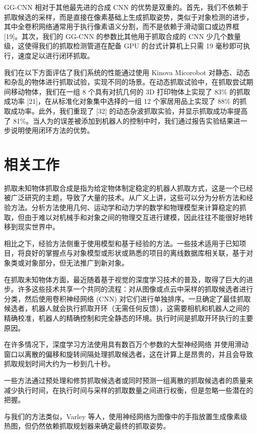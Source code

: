 GG-CNN 相对于其他最先进的合成 CNN 的优势是双重的。首先，我们不依赖于抓取候选的采样，而是直接在像素基础上生成抓取姿势，类似于对象检测的进步，其中全卷积网络通常用于执行像素语义分割，而不是依赖于滑动窗口或边界框 [19]。其次，我们的 GG-CNN 的参数比其他用于抓取合成的 CNN 少几个数量级，这使得我们的抓取检测管道在配备 GPU 的台式计算机上只需 19 毫秒即可执行，速度足以进行闭环抓取。


我们在以下方面评估了我们系统的性能通过使用 Kinova Micorobot 对静态、动态和杂乱的物体进行抓取试验，实现不同的场景。在动态抓取试验中，在抓取尝试期间移动物体，我们在一组 8 个具有对抗几何的 3D 打印物体上实现了 83\% 的抓取成功率 [21]，在从标准化对象集中选择的一组 12 个家居用品上实现了 88\% 的抓取成功率。此外，我们重现了 [32] 的动态杂波抓取实验，并显示抓取成功率提高了 81\%。当人为的误差被添加到机器人的控制中时，我们通过报告实验结果进一步说明使用闭环方法的优势。
\section{相关工作}
抓取未知物体抓取合成是指为给定物体制定稳定的机器人抓取方式，这是一个已经被广泛研究的主题，导致了大量的技术。从广义上讲，这些可以分为分析方法和经验方法。分析方法使用几何、运动学和动力学的数学和物理模型来计算稳定的抓取，但由于难以对机械手和对象之间的物理交互进行建模，因此往往不能很好地转移到现实世界中。


相比之下，经验方法侧重于使用模型和基于经验的方法。一些技术适用于已知项目，将良好的掌握点与对象模型或形状或熟悉的项目的离线数据库相关联，基于对象类或对象部分，但无法推广到新对象。


在抓取未知物体方面，最近随着基于视觉的深度学习技术的普及，取得了巨大的进步。许多这些技术共享一个共同的流程：对从图像或点云中采样的抓取候选者进行分类，然后使用卷积神经网络 (CNN) 对它们进行单独排序。一旦确定了最佳抓取候选者，机器人就会执行抓取开环（无需任何反馈），这需要相机和机器人之间的精确校准，机器人的精确控制和完全静态的环境。执行时间是抓取开环执行的主要原因。


在许多情况下，深度学习方法使用具有数百万个参数的大型神经网络 并使用滑动窗口以离散的偏移和旋转间隔处理抓取候选者，这在计算上是昂贵的，并且会导致抓取规划时间大约为一秒到几十秒。

一些方法通过预处理和修剪抓取候选者或同时预测一组离散的抓取候选者的质量来减少执行时间，在执行时间与采样的抓取数量之间进行权衡，但是忽略一些潜在的把握。


与我们的方法类似，Varley 等人，使用神经网络为图像中的手指放置生成像素级热图，但仍然依赖抓取规划器来确定最终的抓取姿势。


